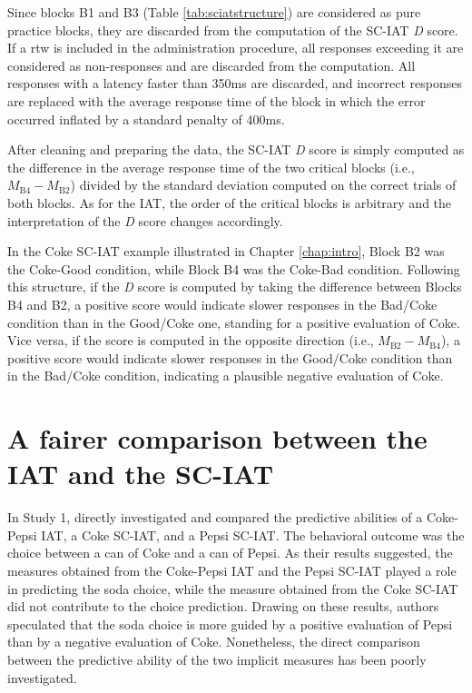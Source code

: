 \documentclass[12pt]{book}
\begin{document}
Since blocks B1 and B3 (Table \ref{tab:sciatstructure}) are considered as pure practice blocks, they are discarded from the computation of the SC-IAT \emph{D} score. If a rtw is included in the administration procedure, all responses exceeding it are considered as non-responses and are discarded from the computation. All responses with a latency faster than 350ms are discarded, and incorrect responses are replaced with the average response time of the block in which the error occurred inflated by a standard penalty of 400ms. 

After cleaning and preparing the data, the SC-IAT \emph{D} score is simply computed as the difference in the average response time of the two critical blocks (i.e., $M_{\text{B4}} - M_{\text{B2}}$) divided by the standard deviation computed on the correct trials of both blocks. As for the IAT, the order of the critical blocks is arbitrary and the interpretation of the \emph{D} score changes accordingly. 

In the Coke SC-IAT example illustrated in Chapter \ref{chap:intro}, Block B2 was the Coke-Good condition, while Block B4 was the Coke-Bad condition.
Following this structure, if the \emph{D} score is computed by taking the difference between Blocks B4 and B2, a positive score would indicate slower responses in the Bad/Coke condition than in the Good/Coke one, standing for a positive evaluation of Coke. Vice versa, if the score is computed in the opposite direction (i.e., $M_{\text{B2}} - M_{\text{B4}}$), a positive score would indicate slower responses in the Good/Coke condition than in the Bad/Coke condition, indicating a plausible negative evaluation of Coke. 


\section[A fairer comparison between the IAT and the SC-IAT]{A fairer comparison between the IAT and the SC-IAT}

In Study 1,  directly investigated and compared the predictive abilities of a Coke-Pepsi IAT, a Coke SC-IAT, and a Pepsi SC-IAT. 
The behavioral outcome was the choice between a can of Coke and a can of Pepsi.
As their results suggested, the measures obtained from the Coke-Pepsi IAT and the Pepsi SC-IAT played  a role in predicting the soda choice, while the measure obtained from the Coke SC-IAT did not contribute to the choice prediction. 
Drawing on these results, authors speculated that the soda choice is more guided by a positive evaluation of Pepsi than by a negative evaluation of Coke. Nonetheless, the direct comparison between the predictive ability of the two implicit measures has been poorly investigated. 
\end{document}
